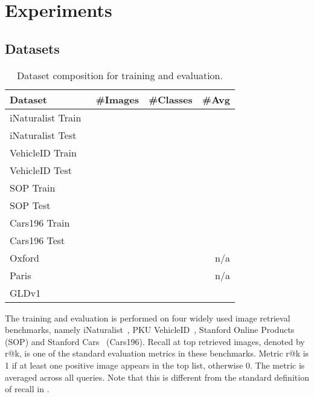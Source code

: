 \section{Experiments}
\label{sec:experiments}

\subsection{Datasets}
\label{sec:datasets}

\begin{table}
\setlength\extrarowheight{1pt}
\begin{center}
\small
\begin{tabular}{l|r|r|r}
    \hline
    \textbf{Dataset} & \textbf{\#Images} &  \textbf{\#Classes} & \textbf{\#Avg}\\
    \hline\hline
    iNaturalist Train~\cite{vms+18} &  &  &  \\
    iNaturalist Test~\cite{vms+18} &  &  &  \\
    VehicleID Train~\cite{ltw+16} &  &  &  \\
    VehicleID Test~\cite{ltw+16} &  &  &  \\
    SOP Train~\cite{ohb16} &  &   &  \\
    SOP Test~\cite{ohb16} &  &   &  \\
    Cars196 Train~\cite{ksd+13} &  &  &  \\
    Cars196 Test~\cite{ksd+13} &  &  &  \\
    \hline
    Oxford~\cite{rit+18} &  &  & n/a \\
    Paris~\cite{rit+18} &  &  & n/a \\
    GLDv1~\cite{nas+17} &  &  &  \\
    \hline
\end{tabular}
\end{center}
\vspace{-1.5em}
\caption{Dataset composition for training and evaluation.}
\label{tab:datasets}
\vspace{-1em}
\end{table}

The training and evaluation is performed on four widely used image retrieval benchmarks, namely iNaturalist~\cite{vms+18}, PKU VehicleID~\cite{ltw+16}, Stanford Online Products~\cite{ohb16} (SOP) and Stanford Cars~\cite{ksd+13} (Cars196). Recall at top  retrieved images,  denoted by r@k, is one of the standard evaluation metrics in these benchmarks.  Metric r@k is 1 if at least one positive image appears in the top  list, otherwise 0. The metric is averaged across all queries. Note that this is different from the standard definition of recall in . 

